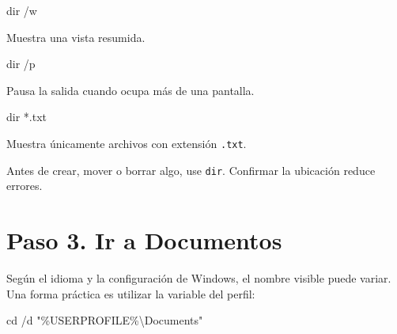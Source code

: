 \documentclass[
  spanish,
  letterpaper,
]{scrbook}
\newenvironment{Shaded}{\begin{snugshade}}{\end{snugshade}}
\newcommand{\AttributeTok}[1]{\textcolor[rgb]{0.40,0.45,0.13}{#1}}
\newcommand{\BuiltInTok}[1]{\textcolor[rgb]{0.00,0.23,0.31}{#1}}
\newcommand{\NormalTok}[1]{\textcolor[rgb]{0.00,0.23,0.31}{#1}}
\newcommand{\PreprocessorTok}[1]{\textcolor[rgb]{0.68,0.00,0.00}{#1}}
\newcommand{\StringTok}[1]{\textcolor[rgb]{0.13,0.47,0.30}{#1}}
\newcommand{\VariableTok}[1]{\textcolor[rgb]{0.07,0.07,0.07}{#1}}
\begin{document}
\begin{Shaded}
\begin{Highlighting}[]
\BuiltInTok{dir} \AttributeTok{/w}
\end{Highlighting}
\end{Shaded}

Muestra una vista resumida.

\begin{Shaded}
\begin{Highlighting}[]
\BuiltInTok{dir} \AttributeTok{/p}
\end{Highlighting}
\end{Shaded}

Pausa la salida cuando ocupa más de una pantalla.

\begin{Shaded}
\begin{Highlighting}[]
\BuiltInTok{dir}\NormalTok{ *.txt}
\end{Highlighting}
\end{Shaded}

Muestra únicamente archivos con extensión \texttt{.txt}.

\begin{tcolorbox}[enhanced jigsaw, arc=.35mm, bottomrule=.15mm, bottomtitle=1mm, breakable, colback=white, colbacktitle=quarto-callout-tip-color!10!white, colframe=quarto-callout-tip-color-frame, coltitle=black, left=2mm, leftrule=.75mm, opacityback=0, opacitybacktitle=0.6, rightrule=.15mm, title=\textcolor{quarto-callout-tip-color}{\faLightbulb}\hspace{0.5em}{Lectura antes de acción}, titlerule=0mm, toprule=.15mm, toptitle=1mm]

Antes de crear, mover o borrar algo, use \texttt{dir}. Confirmar la
ubicación reduce errores.

\end{tcolorbox}

\section{Paso 3. Ir a Documentos}\label{paso-3.-ir-a-documentos}

Según el idioma y la configuración de Windows, el nombre visible puede
variar. Una forma práctica es utilizar la variable del perfil:

\begin{Shaded}
\begin{Highlighting}[]
\BuiltInTok{cd} \AttributeTok{/d} \StringTok{"}\PreprocessorTok{\%}\VariableTok{USERPROFILE}\PreprocessorTok{\%}\StringTok{\textbackslash{}Documents"}
\end{Highlighting}
\end{Shaded}
\end{document}
